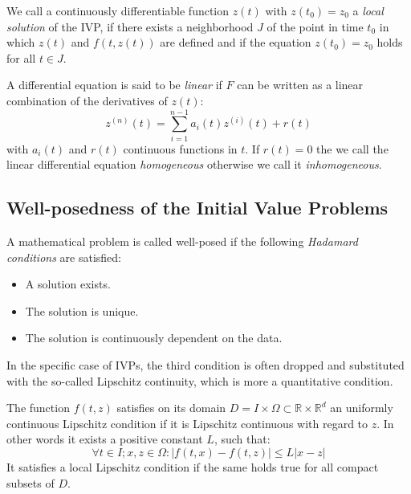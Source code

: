 \begin{definition}
  We call a continuously differentiable function $z(t)$ with $z(t_0) = z_0$
  a \textit{local solution} of the IVP, if there exists a	neighborhood $J$
  of the point in time $t_0$ in which $z(t)$ and $f(t,z(t))$ are defined
  and if the equation $z(t_0) = z_0$ holds for all $t \in J$.
\end{definition}

\begin{definition}
A differential equation is said to be \textit{linear} if $F$ can be written
as a linear combination of the derivatives of $z(t)$:
\begin{equation}
  z^{(n)}(t) = \sum_{i=1}^{n-1} a_i(t)z^{(i)}(t)+r(t)
\end{equation}
with $a_i(t)$ and $r(t)$ continuous functions in $t$.
If $r(t)=0$ the we call the linear differential equation 
\textit{homogeneous} otherwise we call it \textit{inhomogeneous}.
\end{definition}

\subsection{Well-posedness of the Initial Value Problems}

\begin{definition}
  A mathematical problem is called well-posed if the following \textit{Hadamard conditions} are satisfied:
  \begin{itemize}
	\setlength{\itemsep}{0pt}
	\item A solution exists.
	\item The solution is unique.
	\item The solution is continuously dependent on the data.
  \end{itemize}
\end{definition}

In the specific case of IVPs, the third condition is often 
dropped and substituted with the so-called Lipschitz continuity,
which is more a quantitative condition.

\begin{definition}
	The function $f(t,z)$ satisfies on its domain 
	$D = I \times \Omega \subset \mathbb{R} \times \mathbb{R}^d$
	an uniformly continuous Lipschitz condition if it is Lipschitz
	continuous with regard to $z$. In other words it exists a positive constant $L$, such that:
	\begin{equation}
		\forall t\in I; x,z \in \Omega : |f(t,x) - f(t,z)| \leq L |x-z|
	\end{equation}
	It satisfies a local Lipschitz condition if the same holds true for all compact subsets of $D$.
\end{definition}

